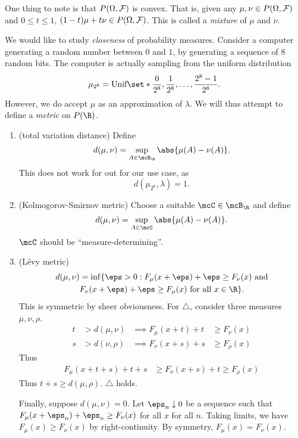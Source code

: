 One thing to note is that $P(\Omega, \mathcal F)$ is convex.
That is, given any $\mu, \nu \in P(\Omega, \mathcal F)$ and $0 \le t \le 1$,
$(1 - t)\mu + t\nu \in P(\Omega, \mathcal F)$.
This is called a \emph{mixture} of $\mu$ and $\nu$.

We would like to study \emph{closeness} of probability measures.
Consider a computer generating a random number between $0$ and $1$,
by generating a sequence of $8$ random bits.
The computer is actually sampling from the uniform distribution \[
    \mu_{2^8} = \text{Unif} \set*{\frac{0}{2^8}, \frac{1}{2^8}, \dots,
                            \frac{2^8 - 1}{2^8}}.
\] However, we do accept $\mu$ as an approximation of $\lambda$.
We will thus attempt to define a \emph{metric} on $P(\R)$.

\begin{enumerate}[label=Attempt \arabic*.]
    \item (total variation distance) Define \[
        d(\mu, \nu) = \sup_{A \in \mcB_\R} \abs{\mu(A) - \nu(A)}.
    \] This does not work for out for our use case, as \[
        d(\mu_{2^8}, \lambda) = 1.
    \]
    \item (Kolmogorov-Smirnov metric) Choose a suitable $\mcC \in \mcB_\R$
    and define \[
        d(\mu, \nu) = \sup_{A \in \mcC} \abs{\mu(A) - \nu(A)}.
    \] $\mcC$ should be ``measure-determining''.
    \item (L\'evy metric)  \begin{multline*}
        d(\mu, \nu) = \inf\{\eps > 0 : F_\mu(x + \eps) + \eps \ge F_\nu(x)
            \text{ and} \\
        F_\nu(x + \eps) + \eps \ge F_\mu(x)
                            \text{ for all } x \in \R\}.
    \end{multline*}
    This is symmetric by sheer obviousness.
    For $\triangle$, consider three measures $\mu, \nu, \rho$.
    \begin{align*}
        t &> d(\mu, \nu) &\implies F_\mu(x + t) + t &\ge F_\nu(x) \\
        s &> d(\nu, \rho) &\implies F_\nu(x + s) + s &\ge F_\rho(x)
    \end{align*} Thus \begin{align*}
        F_\mu(x + t + s) + t + s &\ge F_\nu(x + s) + t \ge F_\rho(x)
    \end{align*}
    Thus $t + s \ge d(\mu, \rho)$.
    $\triangle$ holds.

    Finally, suppose $d(\mu, \nu) = 0$.
    Let $\eps_n \downarrow 0$ be a sequence such that
    $F_\mu(x + \eps_n) + \eps_n \ge F_\nu(x)$ for all $x$ for all $n$.
    Taking limits, we have $F_\mu(x) \ge F_\nu(x)$ by right-continuity.
    By symmetry, $F_\mu(x) = F_\nu(x)$.
\end{enumerate}
